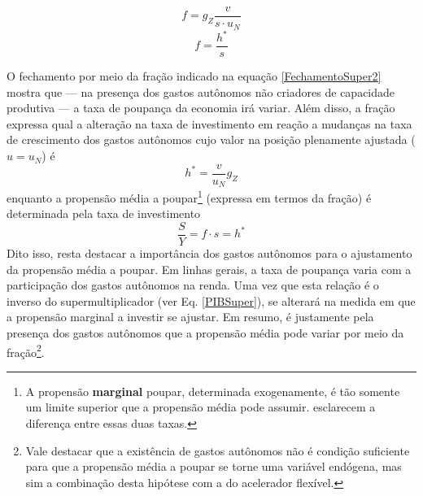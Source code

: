 \begin{equation}
\label{FechamentoSuper}
f =  g_Z\frac{ v}{s\cdot  u_N}
\end{equation}
\begin{equation}
\label{FechamentoSuper2}
f = \frac{h^*}{ s}
\end{equation}

O fechamento por meio da fração indicado na equação \ref{FechamentoSuper2} mostra que --- na presença dos gastos autônomos não criadores de capacidade produtiva --- a taxa de poupança da economia irá variar.
Além disso, a fração expressa qual a alteração na taxa de investimento em reação a mudanças na taxa de crescimento dos gastos autônomos cujo valor na posição plenamente ajustada ($u = u_N$) é
$$
h^* = \frac{v}{u_N}g_Z
$$
enquanto a propensão média a poupar\footnote{A propensão \textbf{marginal} poupar, determinada exogenamente, é tão somente um limite superior que a propensão média pode assumir. \textcite[p.~51--52]{serrano_o_2000} esclarecem a diferença entre essas duas taxas.} (expressa em termos da fração) é determinada pela taxa de investimento 
$$
\frac{S}{Y} = f\cdot s = h^*
$$
Dito isso, resta destacar a importância dos gastos autônomos para o ajustamento da propensão média a poupar.
Em linhas gerais, a taxa de poupança varia com a participação dos gastos autônomos na renda.
Uma vez que esta relação é o inverso do supermultiplicador (ver Eq. \ref{PIBSuper}), se alterará na medida em que a propensão marginal a investir se ajustar.
Em resumo, é justamente pela presença dos gastos autônomos que a propensão média pode variar por meio da fração\footnote{
	Vale destacar que a existência de gastos autônomos não é condição suficiente para que a propensão média a poupar se torne uma variável endógena, mas sim a combinação desta hipótese com a do acelerador flexível.
}.

